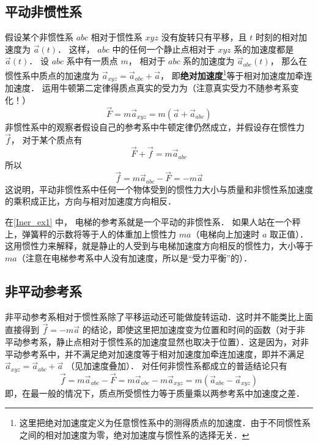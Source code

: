 \subsection{平动非惯性系}
假设某个非惯性系 $abc$ 相对于惯性系 $xyz$ 没有旋转只有平移，且 $t$ 时刻的相对加速度为 $\vec a(t)$． 这样， $abc$ 中的任何一个静止点相对于 $xyz$ 系的加速度都是 $\vec a(t)$． 设 $abc$ 系中有一质点 $m$， 相对于 $abc$ 系的加速度为 $\vec a_{abc} (t)$， 那么在惯性系中质点的加速度为 $\vec a_{xyz} = \vec a_{abc} + \vec a$， 即\textbf{绝对加速度}\footnote{这里把绝对加速度定义为任意惯性系中的测得质点的加速度．由于不同惯性系之间的相对加速度为零，绝对加速度与惯性系的选择无关．}等于相对加速度加牵连加速度． 运用牛顿第二定律得质点真实的受力为（注意真实受力不随参考系变化！）
\begin{equation}
\vec F = m \vec a_{xyz} = m(\vec a + \vec a_{abc} )
\end{equation}
非惯性系中的观察者假设自己的参考系中牛顿定律仍然成立，并假设存在惯性力 $\vec f$， 对于某个质点有
\begin{equation}
\vec F + \vec f = m \vec a_{abc}
\end{equation}
所以
\begin{equation}
\vec f = m \vec a_{abc} - \vec F =  - m\vec a
\end{equation}
这说明，平动非惯性系中任何一个物体受到的惯性力大小与质量和非惯性系加速度的乘积成正比，方向与相对加速度方向相反．

在\autoref{Iner_ex1} 中， 电梯的参考系就是一个平动的非惯性系． 如果人站在一个秤上，弹簧秤的示数将等于人的体重加上惯性力 $ma$（电梯向上加速时 $a$ 取正值）． 这用惯性力来解释，就是静止的人受到与电梯加速度方向相反的惯性力，大小等于 $ma$（注意在电梯参考系中人没有加速度，所以是“受力平衡”的）．

\subsection{非平动参考系}

非平动参考系相对于惯性系除了平移运动还可能做旋转运动．这时并不能类比上面直接得到 $\vec f =  - m\vec a$ 的结论，即使这里把加速度变为位置和时间的函数（对于非平动参考系，静止点相对于惯性系的加速度显然也取决于位置）．这是因为，对非平动参考系中，并不满足绝对加速度等于相对加速度加牵连加速度，即并不满足 $\vec a_{xyz} = \vec a_{abc} + \vec a$ （见加速度叠加）． %
对任何非惯性系都成立的普适结论只有
\begin{equation}
\vec f = m \vec a_{abc} - \vec F = m \vec a_{abc} - m \vec a_{xyz} = m( \vec a_{abc} - \vec a_{xyz})
\end{equation}
即，在最一般的情况下，质点所受惯性力等于质量乘以两参考系中加速度之差．

